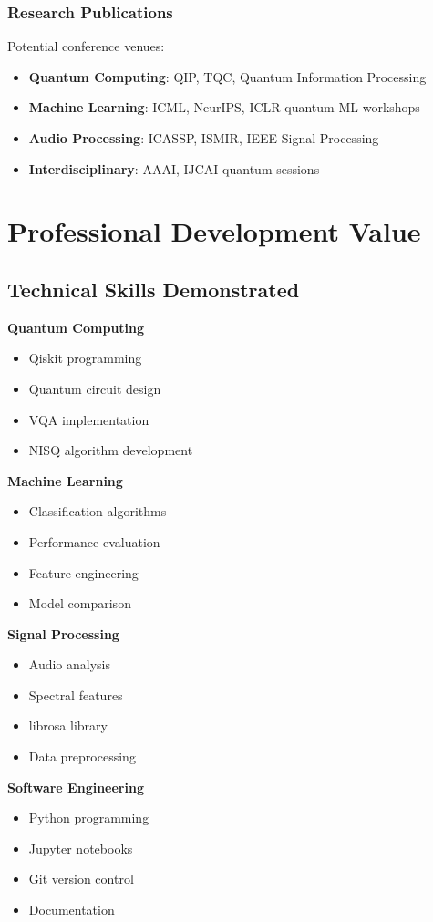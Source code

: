\documentclass[11pt,a4paper]{article}
\begin{document}
\subsubsection{Research Publications}
Potential conference venues:
\begin{itemize}
    \item \textbf{Quantum Computing}: QIP, TQC, Quantum Information Processing
    \item \textbf{Machine Learning}: ICML, NeurIPS, ICLR quantum ML workshops
    \item \textbf{Audio Processing}: ICASSP, ISMIR, IEEE Signal Processing
    \item \textbf{Interdisciplinary}: AAAI, IJCAI quantum sessions
\end{itemize}

\section{Professional Development Value}

\subsection{Technical Skills Demonstrated}

\begin{multicols}{2}
\textbf{Quantum Computing}
\begin{itemize}
    \item Qiskit programming
    \item Quantum circuit design
    \item VQA implementation
    \item NISQ algorithm development
\end{itemize}

\textbf{Machine Learning}
\begin{itemize}
    \item Classification algorithms
    \item Performance evaluation
    \item Feature engineering
    \item Model comparison
\end{itemize}

\textbf{Signal Processing}
\begin{itemize}
    \item Audio analysis
    \item Spectral features
    \item librosa library
    \item Data preprocessing
\end{itemize}

\textbf{Software Engineering}
\begin{itemize}
    \item Python programming
    \item Jupyter notebooks
    \item Git version control
    \item Documentation
\end{itemize}
\end{multicols}
\end{document}
